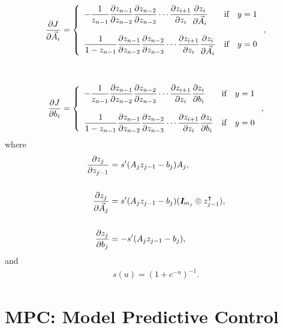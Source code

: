 \documentclass{article}
\begin{document}
    \begin{align*}
        \frac{\partial  J }{\partial \vec{A}_i}&=\left\{
            \begin{array}{lllllllllllllllllll}
                -\dfrac{1}{z_{n-1}} \dfrac{\partial z_{n-1}}{\partial z_{n-2}}\dfrac{\partial z_{n-2}}{\partial z_{n-3}}\cdots
        \dfrac{\partial z_{i+1}}{\partial z_i}\dfrac{\partial z_i}{\partial \vec{A}_i}
        & \text{if}\quad y=1\\\\
        \dfrac{1}{1-z_{n-1}} \dfrac{\partial z_{n-1}}{\partial z_{n-2}}\dfrac{\partial z_{n-2}}{\partial z_{n-3}}\cdots
        \dfrac{\partial z_{i+1}}{\partial z_i}\dfrac{\partial z_i}{\partial \vec{A}_i}
        & \text{if}\quad y=0
        \end{array}\right.,\\\\\\
        \frac{\partial  J }{\partial b_i}&=\left\{
            \begin{array}{lllllllllllllllllll}
                -\dfrac{1}{z_{n-1}} \dfrac{\partial z_{n-1}}{\partial z_{n-2}}\dfrac{\partial z_{n-2}}{\partial z_{n-3}}\cdots
                \dfrac{\partial z_{i+1}}{\partial z_i}\dfrac{\partial z_i}{\partial b_i}
        & \text{if}\quad y=1\\\\
        \dfrac{1}{1-z_{n-1}} \dfrac{\partial z_{n-1}}{\partial z_{n-2}}\dfrac{\partial z_{n-2}}{\partial z_{n-3}}\cdots
        \dfrac{\partial z_{i+1}}{\partial z_i}\dfrac{\partial z_i}{\partial b_i}
        & \text{if}\quad y=0
        \end{array}\right.,
    \end{align*}
    where
    \begin{align*}
        \frac{\partial z_j}{\partial z_{j-1}}&=s'(A_jz_{j-1} -b_j)A_j,\\\\
        \frac{\partial z_j}{\partial \vec{A}_j}&=s'(A_jz_{j-1} -b_j)(\emph{\textbf{I}}_{m_j}\otimes z_{j-1} ^\intercal),\\\\
        \frac{\partial z_j}{\partial b_j}&=-s'(A_jz_{j-1} -b_j),
    \end{align*}
    and
    \begin{align*}
        s(u)=(1+e^{-u})^{-1}.
    \end{align*}

\clearpage 

\section{MPC: Model Predictive Control}
\end{document}
